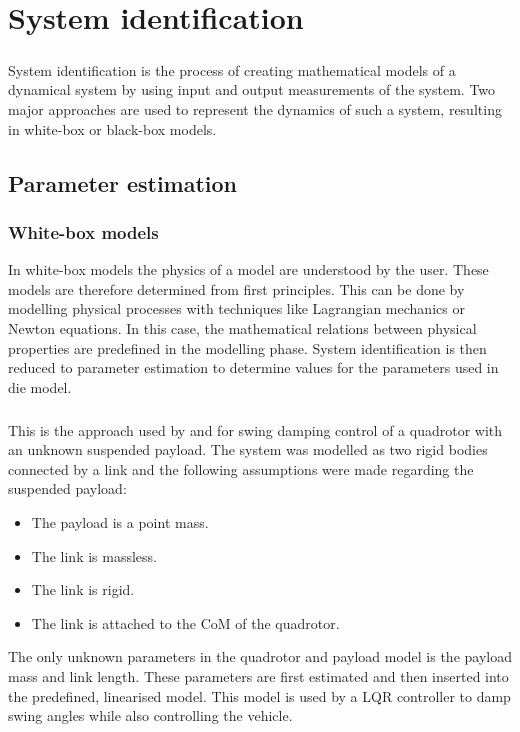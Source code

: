 \graphicspath{{system_id/fig/}}

\chapter{System identification}
\label{chap:system_id}

    \paragraph{}
    System identification is the process of creating mathematical models of a dynamical system by using input and output measurements of the system.
    Two major approaches are used to represent the dynamics of such a system, resulting in white-box or black-box models.

 
\section{Parameter estimation} 

    \subsection{White-box models}

        In white-box models the physics of a model are understood by the user.    
        These models are therefore determined from first principles.
        This can be done by modelling physical processes with techniques like Lagrangian mechanics or Newton equations.
        In this case, the mathematical relations between physical properties are predefined in the modelling phase.
        System identification is then reduced to parameter estimation to determine values for the parameters used in die model.
        
        \paragraph{} 
        This is the approach used by \cite{Erasmus2019} and \cite{Slabber2020} for swing damping control of a quadrotor with an unknown suspended payload.
        The system was modelled as two rigid bodies connected by a link and the following assumptions were made regarding the suspended payload:
        \begin{itemize}
            \item The payload is a point mass.
            \item The link is massless.
            \item The link is rigid.
            \item The link is attached to the CoM of the quadrotor.
        \end{itemize}
        The only unknown parameters in the quadrotor and payload model is the payload mass and link length.
        These parameters are first estimated and then inserted into the predefined, linearised model.
        This model is used by a LQR controller to damp swing angles while also controlling the vehicle.

